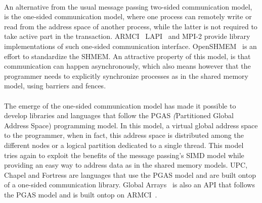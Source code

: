\paragraph{}
An alternative from the usual message passing two-sided communication model, 
is the one-sided communication model, where one process can remotely write
or read from the address space of another process, while the latter is not required 
to take active part in the transaction.  ARMCI~\cite{Nieplocha99armci:a} 
LAPI~\cite{Shah:1998:PEL:876880.879642} and MPI-2 provide library implementations of such 
one-sided communication interface. OpenSHMEM~\cite{Chapman:2010:IOS:2020373.2020375} is 
an effort to standardize the SHMEM. An attractive property of this model, is that communication can happen 
asynchronously, which also means however that the programmer needs to explicitly synchronize
processes as in the shared memory model, using barriers and fences.  

\paragraph{}
The emerge of the one-sided communication model has made it possible to develop libraries and languages
that follow the PGAS \emph(Partitioned Global Address Space) programming model.  In this model,
a virtual global address space to the programmer, when in fact, this address space is 
distributed among the different nodes or a logical partition dedicated to a single thread.  
This model tries again to exploit the benefits of the message passing's SIMD model while providing
an easy way to address data as in the shared memory models.  UPC, Chapel and Fortress are languages
that use the PGAS model and are built ontop of a one-sided communication library.  
Global Arrays~\cite{Nieplocha:2006:AAP:1125980.1125985} is also
an API that follows the PGAS model and is built ontop on ARMCI~\cite{Nieplocha99armci:a}. 

